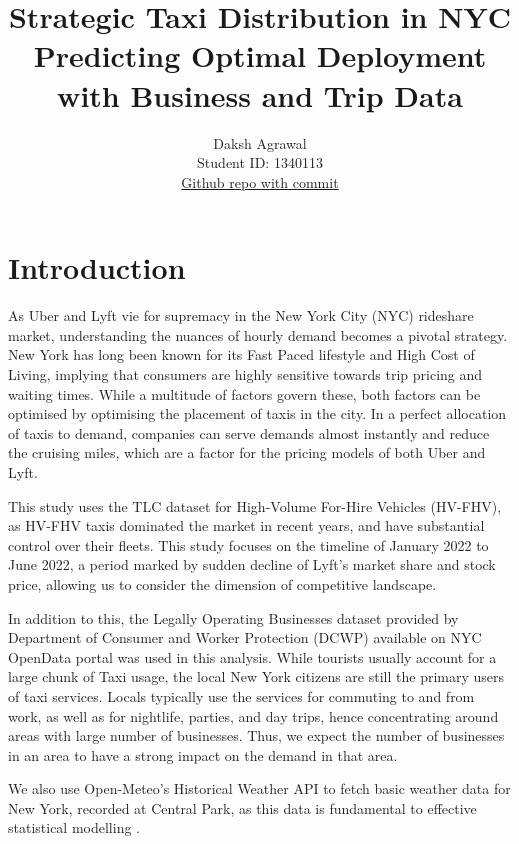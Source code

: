\documentclass[11pt]{article}
\title{\textbf{Strategic Taxi Distribution in NYC} \\ Predicting Optimal Deployment with Business and Trip Data}
\author{
Daksh Agrawal \\
Student ID: 1340113 \\
\href{https://github.com/MAST30034-AppliedDataScience/project-1-individual-dakshAg}{Github repo with commit}
}
\begin{document}
\maketitle

\section{Introduction}

As Uber and Lyft vie for supremacy in the New York City (NYC) rideshare market, understanding the nuances of hourly demand becomes a pivotal strategy\cite{2022sensorreading}. New York has long been known for its Fast Paced lifestyle and High Cost of Living, implying that consumers are highly sensitive towards trip pricing and waiting times. While a multitude of factors govern these, both factors can be optimised by optimising the placement of taxis in the city\cite{2022sensorreading}. In a perfect allocation of taxis to demand, companies can serve demands almost instantly and reduce the cruising miles, which are a factor for the pricing models of both Uber and Lyft\cite{uberpricing, lyftpricing}.

This study uses the TLC dataset for High-Volume For-Hire Vehicles (HV-FHV), as HV-FHV taxis dominated the market in recent years, and have substantial control over their fleets\cite{tlchomepage}. This study focuses on the timeline of January 2022 to June 2022, a period marked by sudden decline of Lyft’s market share and stock price, allowing us to consider the dimension of competitive landscape\cite{lyftfall}.

In addition to this, the Legally Operating Businesses dataset provided by Department of Consumer and Worker Protection (DCWP) available on NYC OpenData portal was used in this analysis\cite{lobhomepage}. While tourists usually account for a large chunk of Taxi usage, the local New York citizens are still the primary users of taxi services\cite{communingpdf}. Locals typically use the services for commuting to and from work, as well as for nightlife, parties, and day trips, hence concentrating around areas with large number of businesses. Thus, we expect the number of businesses in an area to have a strong impact on the demand in that area.

We also use Open-Meteo's Historical Weather API to fetch basic weather data for New York, recorded at Central Park, as this data is fundamental to effective statistical modelling \cite{weather}.
\end{document}

